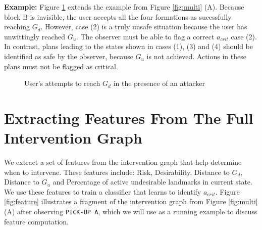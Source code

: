 \documentclass[letterpaper]{article}
\theoremstyle{plain}
\begin{document}
\textbf{Example:} Figure \ref{fig:fails} extends the example from Figure \ref{fig:multi} (A). Because block B is invisible, the user accepts all the four formations as sucessfully reaching $G_d$. However, case (2) is a truly unsafe situation because the user has unwittingly reached $G_u$. The observer must be able to flag a correct $a_{crit}$ case (2). In contrast, plans leading to the states shown in cases (1), (3) and (4) should be identified as safe by the observer, because $G_u$ is not achieved. Actions in these plans must not be flagged as critical.
\begin{figure}[ht]
        \caption{User's attempts to reach $G_d$ in the presence of an attacker}
        \label{fig:fails}
\end{figure}


\section{Extracting Features From The Full Intervention Graph}
We extract a set of features from the intervention graph that help determine when to intervene. These features include: Risk, Desirability, Distance to $G_d$, Distance to $G_u$ and Percentage of active undesirable landmarks in current state. We use these features to train a classifier that learns to identify $a_{crit}$. Figure \ref{fig:feature} illustrates a fragment of the intervention graph from Figure \ref{fig:multi} (A) after observing \texttt{PICK-UP A}, which we will use as a running example to discuss feature computation.
\end{document}
